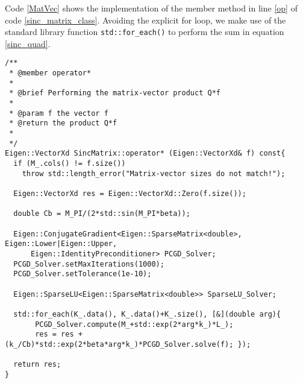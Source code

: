 Code \eqref{MatVec} shows the implementation of the member method in line \eqref{op} of code \eqref{sinc_matrix_class}. Avoiding the explicit for loop, we make use of the standard library function \lstinline{std::for_each()} to perform the sum in equation \eqref{sinc_quad}.

\begin{lstlisting}[caption={$\sinc$ matrix-vector multiplication.}, label={MatVec}]
/** 
 * @member operator*
 *
 * @brief Performing the matrix-vector product Q*f 
 *
 * @param f the vector f 
 * @return the product Q*f
 *
 */
Eigen::VectorXd SincMatrix::operator* (Eigen::VectorXd& f) const{
  if (M_.cols() != f.size())
    throw std::length_error("Matrix-vector sizes do not match!"); 
 
  Eigen::VectorXd res = Eigen::VectorXd::Zero(f.size()); 

  double Cb = M_PI/(2*std::sin(M_PI*beta)); 

  Eigen::ConjugateGradient<Eigen::SparseMatrix<double>, Eigen::Lower|Eigen::Upper,
      Eigen::IdentityPreconditioner> PCGD_Solver; 
  PCGD_Solver.setMaxIterations(1000);
  PCGD_Solver.setTolerance(1e-10);
  
  Eigen::SparseLU<Eigen::SparseMatrix<double>> SparseLU_Solver; 

  std::for_each(K_.data(), K_.data()+K_.size(), [&](double arg){
       PCGD_Solver.compute(M_+std::exp(2*arg*k_)*L_);
       res = res + (k_/Cb)*std::exp(2*beta*arg*k_)*PCGD_Solver.solve(f); });

  return res; 
}
\end{lstlisting}

